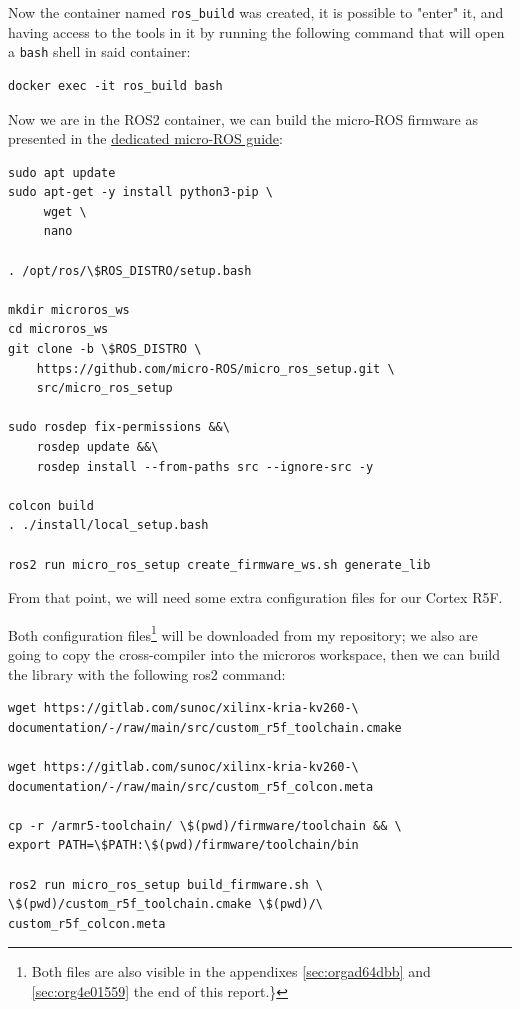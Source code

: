 \documentclass[10pt]{article}
\begin{document}
Now the container named \texttt{ros\_build} was created, it is possible to "enter" it, and having access
to the tools in it by running the following command that will open a \texttt{bash} shell in said container:
\begin{verbatim}
docker exec -it ros_build bash
\end{verbatim}

Now we are in the ROS2 container, we can build the micro-ROS firmware as presented
in the \href{https://micro.ros.org/docs/tutorials/advanced/create\\\_custom\\\_static\\\_library}{dedicated micro-ROS guide}:
\begin{verbatim}
sudo apt update 
sudo apt-get -y install python3-pip \
     wget \
     nano

. /opt/ros/\$ROS_DISTRO/setup.bash

mkdir microros_ws
cd microros_ws
git clone -b \$ROS_DISTRO \
    https://github.com/micro-ROS/micro_ros_setup.git \
    src/micro_ros_setup

sudo rosdep fix-permissions &&\
    rosdep update &&\
    rosdep install --from-paths src --ignore-src -y

colcon build
. ./install/local_setup.bash

ros2 run micro_ros_setup create_firmware_ws.sh generate_lib
\end{verbatim}

From that point, we will need some extra configuration files for our Cortex R5F.

Both configuration files\footnote{Both files are also visible in the appendixes \ref{sec:orgad64dbb}
and \ref{sec:org4e01559} the end of this report.\}} will be downloaded from my repository;
we also are going to copy the cross-compiler into the microros workspace,
then we can build the library with the following ros2 command:
\begin{verbatim}
wget https://gitlab.com/sunoc/xilinx-kria-kv260-\
documentation/-/raw/main/src/custom_r5f_toolchain.cmake

wget https://gitlab.com/sunoc/xilinx-kria-kv260-\
documentation/-/raw/main/src/custom_r5f_colcon.meta

cp -r /armr5-toolchain/ \$(pwd)/firmware/toolchain && \
export PATH=\$PATH:\$(pwd)/firmware/toolchain/bin

ros2 run micro_ros_setup build_firmware.sh \
\$(pwd)/custom_r5f_toolchain.cmake \$(pwd)/\
custom_r5f_colcon.meta
\end{verbatim}
\end{document}
